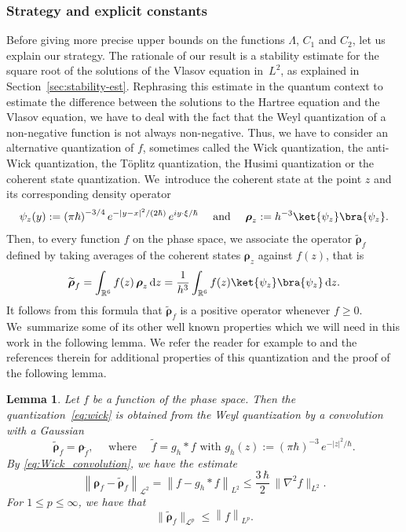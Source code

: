 \documentclass[10pt]{amsart}
\newcommand {\aNrm}[2] {\lVert{#1}\rVert_{#2}}
\newtheorem{lem}{Lemma}[section]
\theoremstyle{definition}
\newcommand {\RR} {\mathbb R}
\newcommand {\RRd} {\RR^6}
\renewcommand {\L} {\mathcal L}
\let\lt\left
\let\rt\right
\renewcommand {\(} {\lt(}
\renewcommand {\)} {\rt)}
\newcommand {\n}[1] {\lt\lvert #1 \rt\rvert}
\newcommand {\nrm}[1] {\lt\lVert #1\rt\rVert}
\newcommand {\Nrm}[2] {\nrm{#1}_{#2}}
\renewcommand {\d} {\mathop{}\!\mathrm{d}}
\newcommand {\intdd} {\int_{\RRd}}
\newcommand {\op} {\boldsymbol{\rho}}
\begin{document}
\subsubsection{Strategy and explicit constants} Before giving more precise upper bounds on the functions $\Lambda$, $C_1$ and $C_2$, let us explain our strategy. The rationale of our result is a stability estimate for the square root of the solutions of the Vlasov equation in~$L^2$, as explained in Section~\ref{sec:stability-est}. Rephrasing this estimate in the quantum context to estimate the difference between the solutions to the Hartree equation and the Vlasov equation, we have to deal with the fact that the Weyl quantization of a non-negative function is not always non-negative. Thus, we have to consider an alternative quantization of $f$, sometimes called the Wick quantization, the anti-Wick quantization, the Töplitz quantization, the Husimi quantization or the coherent state quantization. We~introduce the coherent state at the point $z$ and its corresponding density operator
\begin{equation*}
\psi_z(y):= \(\pi \hbar\)^{-3/4} e^{-\n{y-x}^2/(2\hbar)}\,e^{i y\cdot \xi/\hbar} \quad \text{ and } \quad \op_z := h^{-3}\ket{\psi_z}\bra{\psi_z}.
\end{equation*}
Then, to every function $f$ on the phase space, we associate the operator $\widetilde{\op}_f$ defined by taking averages of the coherent states $\op_z$ against $f(z)$, that is
\begin{equation}\label{eq:wick}
\widetilde{\op}_f = \intdd f(z)\,\op_z\d z = \frac{1}{h^3}\intdd f(z) \ket{\psi_z}\bra{\psi_z}\d z.
\end{equation}
It follows from this formula that $\widetilde{\op}_f$ is a positive operator whenever $f\ge 0$. We~summarize some of its other well known properties which we will need in this work in the following lemma. We refer the reader for example to \cite{lions_sur_1993, lerner_fefferman-phong_2007} and the references therein for additional properties of this quantization and the proof of the following lemma.

\begin{lem}\label{lem:properties_of_Wick}
Let $f$ be a function of the phase space. Then the quantization~\eqref{eq:wick} is obtained from the Weyl quantization by a convolution with a Gaussian
\begin{equation}\label{eq:Wick_convolution}
\widetilde{\op}_f =\op_{\tilde f}, \quad \text{ where } \quad \widetilde f = g_h\ast f \text{ with } g_h(z):= (\pi\hbar)^{-3}\,e^{-\n{z}^2/\hbar}.
\end{equation}
By \eqref{eq:Wick_convolution}, we have the estimate
\begin{equation}\label{eq:Wick_Weyl_error}
\Nrm{\op_f-\widetilde{\op}_f}{\L^2} = \Nrm{f-g_h\ast f}{L^2} \le \frac{3\, \hbar}{2}\,\aNrm{\nabla^2 f}{L^2}.
\end{equation}
For $1\le p\le \infty$, we have that
\begin{equation}\label{eq:Wick_Schatten}
\aNrm{\widetilde{\op}_f}{\L^p}\le \Nrm{f}{L^p}.
\end{equation}
\end{lem}
\end{document}
